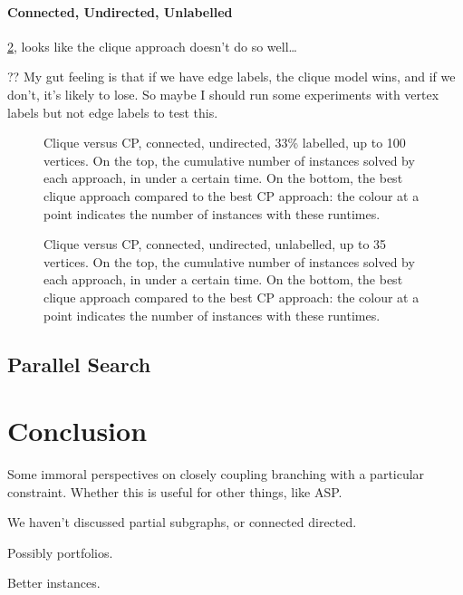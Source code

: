 \documentclass{llncs}
\begin{document}
\paragraph{Connected, Undirected, Unlabelled} \cref{figure:connected-plain}, looks like the clique
approach doesn't do so well\ldots

?? My gut feeling is that if we have edge labels, the clique model wins, and if we don't, it's
likely to lose. So maybe I should run some experiments with vertex labels but not edge labels to
test this.

\begin{figure}[p]
    \centering
    
    \caption{Clique versus CP, connected, undirected, 33\% labelled, up to 100 vertices. On the top,
        the cumulative number of instances solved by each approach, in under a certain time. On the
        bottom, the best clique approach compared to the best CP approach: the colour at a point
        indicates the number of instances with these runtimes.} \label{figure:connected-undir33}
\end{figure}

\begin{figure}[p]
    \centering
    
    \caption{Clique versus CP, connected, undirected, unlabelled, up to 35 vertices. On the top, the
    cumulative number of instances solved by each approach, in under a certain time. On the bottom,
    the best clique approach compared to the best CP approach: the colour at a point indicates the
    number of instances with these runtimes.}
\label{figure:connected-plain}
\end{figure}

\subsection{Parallel Search}

\cite{DBLP:conf/ictai/MinotNS15}

\section{Conclusion}

Some immoral perspectives on closely coupling branching with a particular constraint. Whether this
is useful for other things, like ASP.

We haven't discussed partial subgraphs, or connected directed.

Possibly portfolios.

Better instances.

\FloatBarrier



\end{document}
